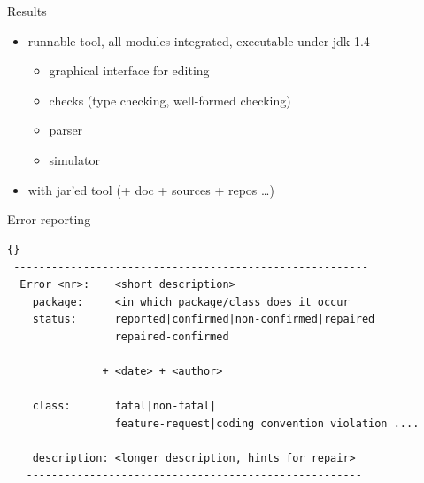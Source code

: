 \iffalse



\begin{myslide}{Results}
  \begin{itemize}
  \item runnable tool, all modules integrated, executable under jdk-1.4
    \begin{itemize}
    \item graphical interface for editing
    \item checks (type checking, well-formed checking)
    \item parser
    \item simulator
    \end{itemize}
  \item {} with jar'ed tool (+ doc + sources + repos
    \ldots)
  \end{itemize}
\end{myslide}










\begin{myslide}{Error reporting}
  \begin{lstlisting}{}
 --------------------------------------------------------
  Error <nr>:    <short description>
    package:     <in which package/class does it occur
    status:      reported|confirmed|non-confirmed|repaired
                 repaired-confirmed

               + <date> + <author>
   
    class:       fatal|non-fatal|
                 feature-request|coding convention violation ....

    description: <longer description, hints for repair>
   -----------------------------------------------------
  \end{lstlisting}
\end{myslide}



